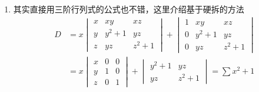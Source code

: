 \begin{enumerate}
\begin{enumerate}
              \item 其实直接用三阶行列式的公式也不错，这里介绍基于硬拆的方法
                    \begin{align*}
                        D & =x\begin{vmatrix}
                                  x & xy    & xz    \\
                                  y & y^2+1 & yz    \\
                                  z & yz    & z^2+1
                              \end{vmatrix}+\begin{vmatrix}
                                                1 & xy    & xz    \\
                                                0 & y^2+1 & yz    \\
                                                0 & yz    & z^2+1
                                            \end{vmatrix} \\
                          & =x\begin{vmatrix}
                                  x & 0 & 0 \\
                                  y & 1 & 0 \\
                                  z & 0 & 1
                              \end{vmatrix}+\begin{vmatrix}
                                                y^2+1 & yz    \\
                                                yz    & z^2+1
                                            \end{vmatrix}
                        =\sum x^2+1
                    \end{align*}
          \end{enumerate}


\end{enumerate}

